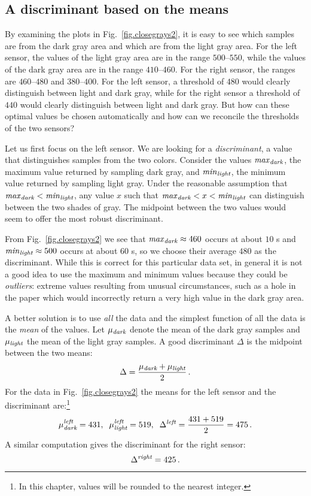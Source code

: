\subsection{A discriminant based on the means}

By examining the plots in Fig.~\ref{fig.closegrays2}, it is easy to see which samples are from the dark gray area and which are from the light gray area. For the left sensor, the values of the light gray area are in the range $500$--$550$, while the values of the dark gray area are in the range $410$--$460$. For the right sensor, the ranges are $460$--$480$ and $380$--$400$. For the left sensor, a threshold of $480$ would clearly distinguish between light and dark gray, while for the right sensor a threshold of $440$ would clearly distinguish between light and dark gray. But how can these optimal values be chosen automatically and how can we reconcile the thresholds of the two sensors?

Let us first focus on the left sensor. We are looking for a \textit{discriminant}, a value that distinguishes samples from the two colors. Consider the values $\mathit{max}_{\textit{\scriptsize dark}}$, the maximum value returned by sampling dark gray, and $\mathit{min}_{\textit{\scriptsize light}}$, the minimum value returned by sampling light gray. Under the reasonable assumption that $\mathit{max}_{\textit{\scriptsize dark}} < \mathit{min}_{\textit{\scriptsize light}}$, any value $x$ such that $\mathit{max}_{\textit{\scriptsize dark}} < x < \mathit{min}_{\textit{\scriptsize light}}$ can distinguish between the two shades of gray. The midpoint between the two values would seem to offer the most robust discriminant.

From Fig.~\ref{fig.closegrays2} we see that $\mathit{max}_{\textit{\scriptsize dark}}\approx 460$ occurs at about $10$ s and $\mathit{min}_{\textit{\scriptsize light}}\approx 500$ occurs at about $60$ s, so we choose their average $480$ as the discriminant. While this is correct for this particular data set, in general it is not a good idea to use the maximum and minimum values because they could be \emph{outliers}: extreme values resulting from unusual circumstances, such as a hole in the paper which would incorrectly return a very high value in the dark gray area.

A better solution is to use \emph{all} the data and the simplest function of all the data is the \emph{mean} of the values. Let $\mu_{\textit{\scriptsize dark}}$ denote the mean of the dark gray samples and $\mu_{\textit{\scriptsize light}}$ the mean of the light gray samples. A good discriminant $\Delta$ is the midpoint between the two means:
\begin{displaymath}
\Delta = \frac{\mu_{\sub{dark}} + \mu_{\sub{light}}}{2}\,.%
\end{displaymath}
For the data in Fig.~\ref{fig.closegrays2} the means for the left sensor and the discriminant are:\footnote{In this chapter, values will be rounded to the nearest integer.}
\[
\mu_{\textit{\scriptsize dark}}^{\textit{\scriptsize left}} = 431,\;\;
\mu_{\textit{\scriptsize light}}^{\textit{\scriptsize left}} = 519,\;\;
\Delta^{\textit{\scriptsize left}} = \frac{431+519}{2} = 475\,.
\]
A similar computation gives the discriminant for the right sensor:
\[
\Delta^{\textit{\scriptsize right}} = 425\,.
\]

